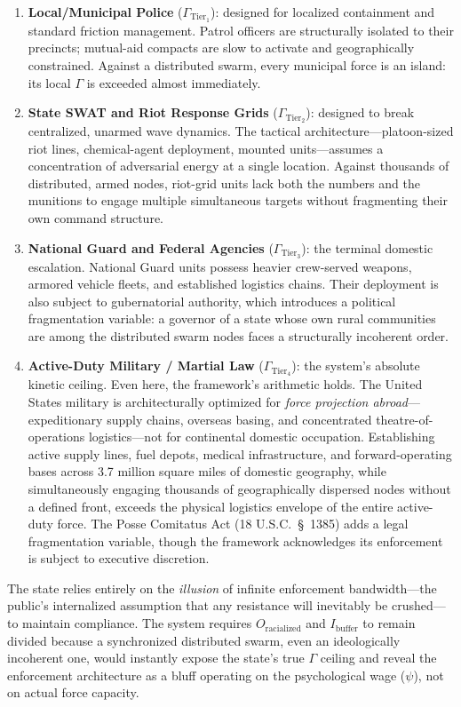 \begin{enumerate}
    \item \textbf{Local/Municipal Police} ($\Gamma_{\text{Tier}_1}$): designed for localized containment and standard friction management. Patrol officers are structurally isolated to their precincts; mutual-aid compacts are slow to activate and geographically constrained. Against a distributed swarm, every municipal force is an island: its local $\Gamma$ is exceeded almost immediately.
    \item \textbf{State SWAT and Riot Response Grids} ($\Gamma_{\text{Tier}_2}$): designed to break centralized, unarmed wave dynamics. The tactical architecture---platoon-sized riot lines, chemical-agent deployment, mounted units---assumes a concentration of adversarial energy at a single location. Against thousands of distributed, armed nodes, riot-grid units lack both the numbers and the munitions to engage multiple simultaneous targets without fragmenting their own command structure.
    \item \textbf{National Guard and Federal Agencies} ($\Gamma_{\text{Tier}_3}$): the terminal domestic escalation. National Guard units possess heavier crew-served weapons, armored vehicle fleets, and established logistics chains. Their deployment is also subject to gubernatorial authority, which introduces a political fragmentation variable: a governor of a state whose own rural communities are among the distributed swarm nodes faces a structurally incoherent order.
    \item \textbf{Active-Duty Military / Martial Law} ($\Gamma_{\text{Tier}_4}$): the system's absolute kinetic ceiling. Even here, the framework's arithmetic holds. The United States military is architecturally optimized for \textit{force projection abroad}---expeditionary supply chains, overseas basing, and concentrated theatre-of-operations logistics---not for continental domestic occupation. Establishing active supply lines, fuel depots, medical infrastructure, and forward-operating bases across 3.7 million square miles of domestic geography, while simultaneously engaging thousands of geographically dispersed nodes without a defined front, exceeds the physical logistics envelope of the entire active-duty force. The Posse Comitatus Act (18 U.S.C.~\S~1385) adds a legal fragmentation variable, though the framework acknowledges its enforcement is subject to executive discretion.
\end{enumerate}

The state relies entirely on the \textit{illusion} of infinite enforcement bandwidth---the public's internalized assumption that any resistance will inevitably be crushed---to maintain compliance. The system requires $O_{\text{racialized}}$ and $I_{\text{buffer}}$ to remain divided because a synchronized distributed swarm, even an ideologically incoherent one, would instantly expose the state's true $\Gamma$ ceiling and reveal the enforcement architecture as a bluff operating on the psychological wage ($\psi$), not on actual force capacity.

